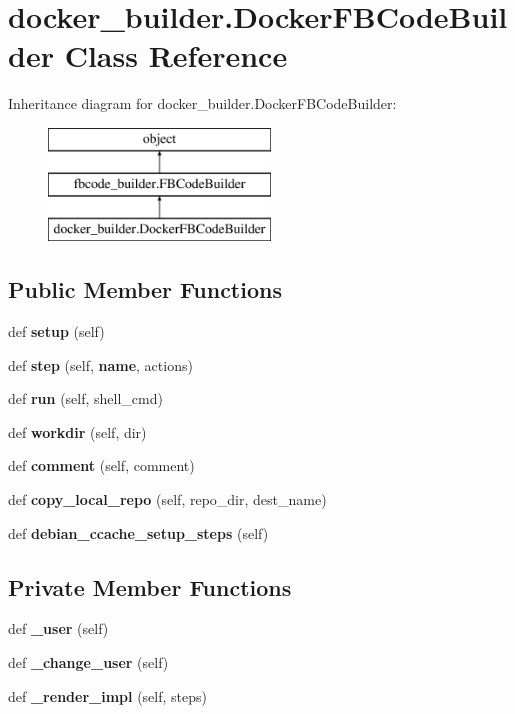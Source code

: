 \section{docker\+\_\+builder.\+Docker\+F\+B\+Code\+Builder Class Reference}
\label{classdocker__builder_1_1DockerFBCodeBuilder}
Inheritance diagram for docker\+\_\+builder.\+Docker\+F\+B\+Code\+Builder\+:\begin{figure}[H]
\begin{center}
\leavevmode
\includegraphics[height=3.000000cm]{classdocker__builder_1_1DockerFBCodeBuilder}
\end{center}
\end{figure}
\subsection*{Public Member Functions}
\begin{DoxyCompactItemize}
\item 
def {\bf setup} (self)
\item 
def {\bf step} (self, {\bf name}, actions)
\item 
def {\bf run} (self, shell\+\_\+cmd)
\item 
def {\bf workdir} (self, dir)
\item 
def {\bf comment} (self, comment)
\item 
def {\bf copy\+\_\+local\+\_\+repo} (self, repo\+\_\+dir, dest\+\_\+name)
\item 
def {\bf debian\+\_\+ccache\+\_\+setup\+\_\+steps} (self)
\end{DoxyCompactItemize}
\subsection*{Private Member Functions}
\begin{DoxyCompactItemize}
\item 
def {\bf \+\_\+user} (self)
\item 
def {\bf \+\_\+change\+\_\+user} (self)
\item 
def {\bf \+\_\+render\+\_\+impl} (self, steps)
\end{DoxyCompactItemize}
